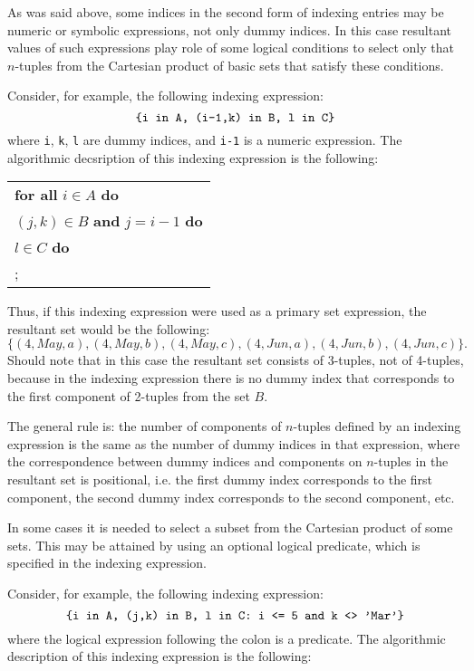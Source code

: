 \documentclass[11pt]{report}
\begin{document}
As was said above, some indices in the second form of indexing entries
may be numeric or symbolic expressions, not only dummy indices. In this
case resultant values of such expressions play role of some logical
conditions to select only that $n$-tuples from the Cartesian product of
basic sets that satisfy these conditions.

Consider, for example, the following indexing expression:
$$\mbox{{\tt\{i in A, (i-1,k) in B, l in C\}}}$$
where {\tt i}, {\tt k}, {\tt l} are dummy indices, and {\tt i-1} is
a numeric expression. The algorithmic decsription of this indexing
expression is the following:

\noindent\hfil
\begin{tabular}{@{}l@{}}
{\bf for all} $i\in A$ {\bf do}\\
\hspace{16pt}{\bf for all} $(j,k)\in B$ {\bf and} $j=i-1$ {\bf do}\\
\hspace{32pt}{\bf for all} $l\in C$ {\bf do}\\
\hspace{48pt}{\it action};\\
\end{tabular}

\noindent Thus, if this indexing expression were used as a primary set
expression, the resultant set would be the following:
$$\{(4,May,a),(4,May,b),(4,May,c),(4,Jun,a),(4,Jun,b),(4,Jun,c)\}.$$
Should note that in this case the resultant set consists of 3-tuples,
not of 4-tuples, because in the indexing expression there is no dummy
index that corresponds to the first component of 2-tuples from the set
$B$.

The general rule is: the number of components of $n$-tuples defined by
an indexing expression is the same as the number of dummy indices in
that expression, where the correspondence between dummy indices and
components on $n$-tuples in the resultant set is positional, i.e. the
first dummy index corresponds to the first component, the second dummy
index corresponds to the second component, etc.

In some cases it is needed to select a subset from the Cartesian
product of some sets. This may be attained by using an optional logical
predicate, which is specified in the indexing expression.

Consider, for example, the following indexing expression:
$$\mbox{{\tt\{i in A, (j,k) in B, l in C: i <= 5 and k <> 'Mar'\}}}$$
where the logical expression following the colon is a predicate. The
algorithmic description of this indexing expression is the following:
\end{document}
